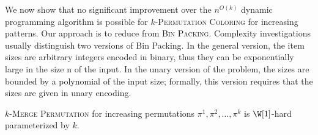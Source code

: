 We now show that no significant improvement over the $n^{O(k)}$ dynamic programming algorithm
is possible for \textsc{$k$-Permutation Coloring}
for increasing patterns.
Our approach is to reduce from \textsc{Bin Packing}.
Complexity investigations usually distinguish two versions of Bin Packing. In the general
version, the item sizes are arbitrary integers encoded in binary, thus they can be exponentially
large in the size n of the input. In the unary version of the problem, the sizes are bounded by
a polynomial of the input size; formally, this version requires that the sizes are given in unary
encoding.

\begin{proposition}
  \label{proposition:Monotonic Permutation Coloring}
  \textsc{$k$-Merge Permutation} for increasing permutations
  $\pi^1, \pi^2, \dots, \pi^k$ is
  $\W[1]$-hard parameterized by $k$.
\end{proposition}

